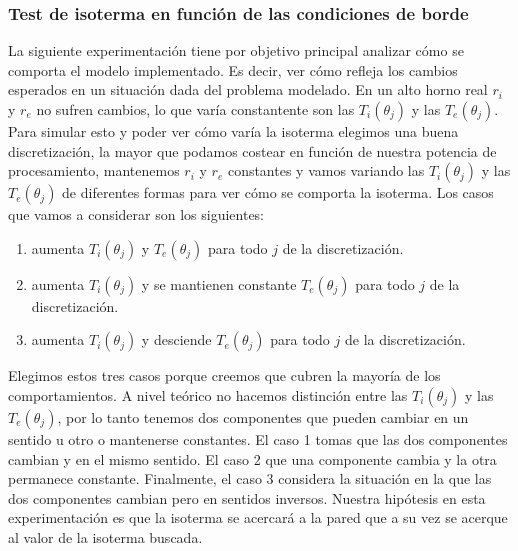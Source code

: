 \subsubsection{Test de isoterma en función de las condiciones de borde}
La siguiente experimentación tiene por objetivo principal analizar cómo se comporta el modelo implementado. 
Es decir, ver cómo refleja los cambios esperados en un situación dada del problema modelado.
En un alto horno real $r_i$ y $r_e$ no sufren cambios, lo que varía constantente son las $T_i(\theta_j)$ y las 
$T_e(\theta_j)$. Para simular esto y poder ver cómo varía la isoterma elegimos una buena discretización, la mayor que 
podamos costear en función de nuestra potencia de procesamiento, mantenemos $r_i$ y $r_e$ constantes y vamos variando 
las $T_i(\theta_j)$ y las $T_e(\theta_j)$ de diferentes formas para ver cómo se comporta la isoterma.
Los casos que vamos a considerar son los siguientes:
\begin{enumerate}
 \item aumenta $T_i(\theta_j)$ y $T_e(\theta_j)$ para todo $j$ de la discretización.
 \item aumenta $T_i(\theta_j)$ y se mantienen constante $T_e(\theta_j)$ para todo $j$ de la discretización.
 \item aumenta $T_i(\theta_j)$ y desciende $T_e(\theta_j)$ para todo $j$ de la discretización.
\end{enumerate}
Elegimos estos tres casos porque creemos que cubren la mayoría de los comportamientos. A nivel teórico no hacemos 
distinción entre las $T_i(\theta_j)$ y las $T_e(\theta_j)$, por lo tanto tenemos dos componentes que pueden cambiar 
en un sentido u otro o mantenerse constantes. El caso 1 tomas que las dos componentes cambian y en el mismo sentido. 
El caso 2 que una componente cambia y la otra permanece constante. Finalmente, el caso 3 considera la situación en la 
que las dos componentes cambian pero en sentidos inversos.
Nuestra hipótesis en esta experimentación es que la isoterma se acercará a la pared que a su vez se acerque al valor
de la isoterma buscada.